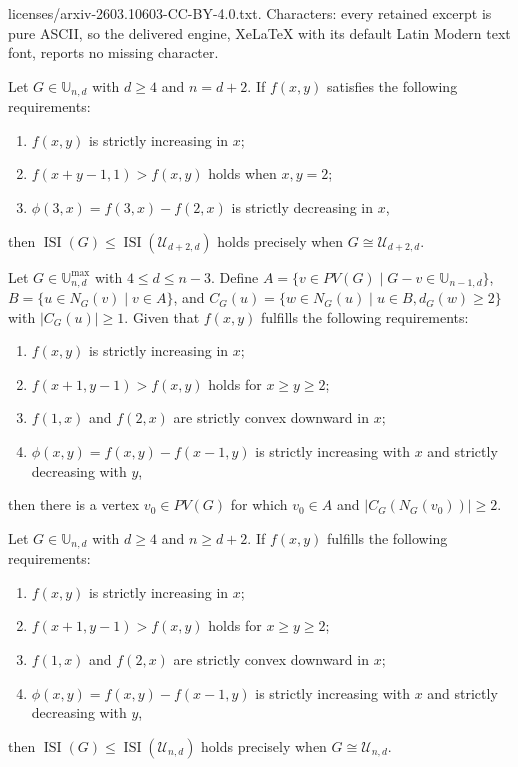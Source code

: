 \documentclass[10pt,a4paper]{amsart}
\newcommand{\ISI}{\operatorname{ISI}}
\newcommand{\UU}{\mathbb{U}}
\begin{document}
licenses/arxiv-2603.10603-CC-BY-4.0.txt. Characters: every retained excerpt is pure ASCII, so the delivered engine, XeLaTeX with its default Latin Modern text font, reports no missing character.
\begin{theorem}
\label{thm:unicyclic_d4_nd2}
Let \(G \in \UU_{n,d}\) with \(d \geq 4\) and \(n = d+2\). If \(f(x,y)\) satisfies the following requirements:
\begin{enumerate}[label=(\roman*)]
\item \(f(x,y)\) is strictly increasing in \(x\);
\item \(f(x+y-1,1) > f(x,y)\) holds when \(x,y = 2\);
\item \(\phi(3,x) = f(3,x) - f(2,x)\) is strictly decreasing in \(x\),
\end{enumerate}
then \(\ISI(G) \leq \ISI(\mathcal{U}_{d+2,d})\) holds precisely when \(G \cong \mathcal{U}_{d+2,d}\).
\end{theorem}

\begin{lemma}
\label{lem:main_lemma}
Let \(G \in \UU_{n,d}^{\max}\) with \(4 \leq d \leq n-3\). Define \(A = \{v \in PV(G) \mid G - v \in \UU_{n-1,d}\}\), \(B = \{u \in N_G(v) \mid v \in A\}\), and \(C_G(u) = \{w \in N_G(u) \mid u \in B, d_G(w) \geq 2\}\) with \(|C_G(u)| \geq 1\). Given that \(f(x,y)\) fulfills the following requirements:
\begin{enumerate}[label=(\roman*)]
\item \(f(x,y)\) is strictly increasing in \(x\);
\item \(f(x+1,y-1) > f(x,y)\) holds for \(x \geq y \geq 2\);
\item \(f(1,x)\) and \(f(2,x)\) are strictly convex downward in \(x\);
\item \(\phi(x,y) = f(x,y) - f(x-1,y)\) is strictly increasing with \(x\) and strictly decreasing with \(y\),
\end{enumerate}
then there is a vertex \(v_0 \in PV(G)\) for which \(v_0 \in A\) and \(|C_G(N_G(v_0))| \geq 2\).
\end{lemma}

\begin{theorem}
\label{thm:unicyclic_d4_general}
Let \(G \in \UU_{n,d}\) with \(d \geq 4\) and \(n \geq d+2\). If \(f(x,y)\) fulfills the following requirements:
\begin{enumerate}[label=(\roman*)]
\item \(f(x,y)\) is strictly increasing in \(x\);
\item \(f(x+1,y-1) > f(x,y)\) holds for \(x \geq y \geq 2\);
\item \(f(1,x)\) and \(f(2,x)\) are strictly convex downward in \(x\);
\item \(\phi(x,y) = f(x,y) - f(x-1,y)\) is strictly increasing with \(x\) and strictly decreasing with \(y\),
\end{enumerate}
then \(\ISI(G) \leq \ISI(\mathcal{U}_{n,d})\) holds precisely when \(G \cong \mathcal{U}_{n,d}\).
\end{theorem}
\end{document}
